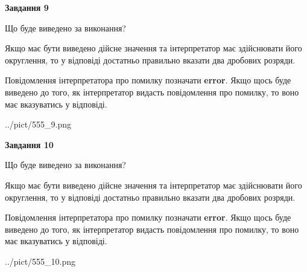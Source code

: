 \documentclass[12pt, ukrainian]{article}
\begin{document}
{\begin {Large}
{\begin {center}\textbf{Завдання 9}\end {center}}\par
Що буде виведено за виконання? \par

Якщо має бути виведено дійсне значення та інтерпретатор має здійснювати його округлення, 
то у відповіді достатньо правильно вказати два дробових розряди.

Повідомлення інтерпретатора про помилку позначати \textbf{error}.
Якщо щось буде виведено до того, як інтерпретатор видасть повідомлення про помилку, 
то воно має вказуватись у відповіді. \par

\begin{center}
	{../pict/555_9.png}
\end{center}
\newpage

{\begin {center}\textbf{Завдання 10}\end {center}}\par
Що буде виведено за виконання? \par

Якщо має бути виведено дійсне значення та інтерпретатор має здійснювати його округлення, 
то у відповіді достатньо правильно вказати два дробових розряди.

Повідомлення інтерпретатора про помилку позначати \textbf{error}.
Якщо щось буде виведено до того, як інтерпретатор видасть повідомлення про помилку, 
то воно має вказуватись у відповіді. \par

\begin{center}
	{../pict/555_10.png}
\end{center}
\newpage

\end {Large}}
\end{document}
